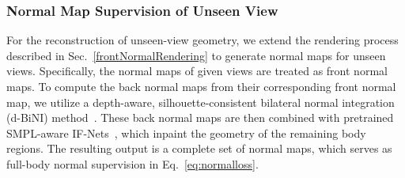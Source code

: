 \subsubsection{Normal Map Supervision of Unseen View} 
\label{BackNormalRendering}
For the reconstruction of unseen-view geometry, we extend the rendering process described in Sec.~\ref{frontNormalRendering} to generate normal maps for unseen views. Specifically, the normal maps of given views are treated as front normal maps. To compute the back normal maps from their corresponding front normal map, we utilize a depth-aware, silhouette-consistent bilateral normal integration (d-BiNI) method~\cite{bini2022cao}. These back normal maps are then combined with pretrained SMPL-aware IF-Nets~\cite{chibane20ifnet}, which inpaint the geometry of the remaining body regions. The resulting output is a complete set of normal maps, which serves as full-body normal supervision in Eq.~\ref{eq:normalloss}.



